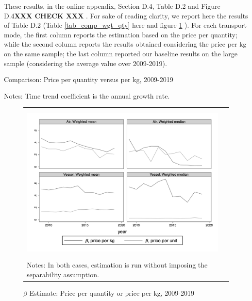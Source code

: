 \documentclass[a4paper,11pt]{article}
\begin{document}
These results, in the online appendix, Section D.4, Table D.2 and Figure D.4\textbf{XXX CHECK XXX }. For sake of reading clarity, we report here the results of Table D.2 (Table \ref{tab_comp_wgt_qty} here and figure \ref{graph_comp_wgt_qty} ). For each transport mode, the first column reports the estimation based on the price per quantity; while the second column reports the results obtained considering the price per kg on the same sample; the last column reported our baseline results on the large sample (considering the average value over 2009-2019).

\begin{table}[htbp]
	\caption{Comparison: Price per quantity versus per kg, 2009-2019}
	\begin{center}		
		
%		
{\parbox[l]{12cm}{ \vspace{4pt}\footnotesize{Notes: Time trend coefficient is the annual growth rate.}}}
\end{center}
	\label{tab_comp_wgt_qty}%
\end{table}%

\begin{figure}[htbp]
	\caption{$\beta$ Estimate: Price per quantity or price per kg, 2009-2019}
	\begin{center}
		\begin{tabular}{cc}
			\includegraphics[height=8cm]{../../revised_article/scatter_chronology_non_separe_wgt_non_separe_qy.png}\\
			\multicolumn{2}{l}{{\footnotesize Notes: In both cases, estimation is run without imposing the separability assumption.}}
		\end{tabular}
	\end{center}
		\label{graph_comp_wgt_qty}%
\end{figure}
\end{document}
